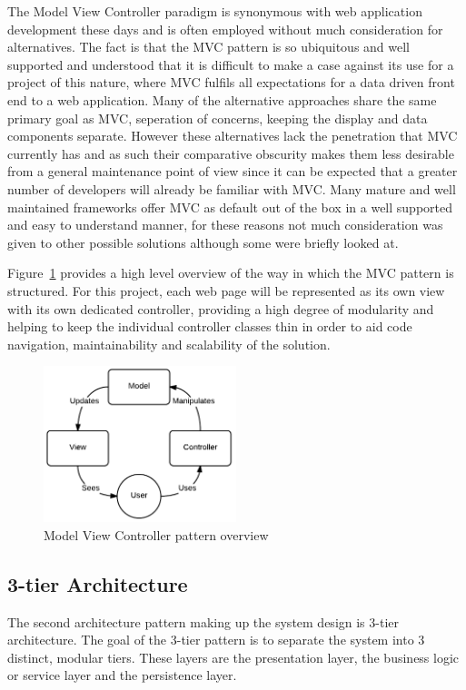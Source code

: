 The Model View Controller paradigm is synonymous with web application development these days and is often employed without much consideration for alternatives. The fact is that the MVC pattern is so ubiquitous and well supported and understood that it is difficult to make a case against its use for a project of this nature, where MVC fulfils all expectations for a data driven front end to a web application. Many of the alternative approaches share the same primary goal as MVC, seperation of concerns, keeping the display and data components separate. However these alternatives lack the penetration that MVC currently has and as such their comparative obscurity makes them less desirable from a general maintenance point of view since it can be expected that a greater number of developers will already be familiar with MVC. Many mature and well maintained frameworks offer MVC as default out of the box in a well supported and easy to understand manner, for these reasons not much consideration was given to other possible solutions although some were briefly looked at.

Figure~\ref{fig:mvc} provides a high level overview of the way in which the MVC pattern is structured. For this project, each web page will be represented as its own view with its own dedicated controller, providing a high degree of modularity and helping to keep the individual controller classes thin in order to aid code navigation, maintainability and scalability of the solution. 

\begin{figure}[H]
    \centering
    \includegraphics[width=0.5\textwidth]{images/design/mvc}
    \caption{Model View Controller pattern overview}
    \label{fig:mvc}
\end{figure}


\subsection{3-tier Architecture}
The second architecture pattern making up the system design is 3-tier architecture. The goal of the 3-tier pattern is to separate the system into 3 distinct, modular tiers. These layers are the presentation layer, the business logic or service layer and the persistence layer.  

